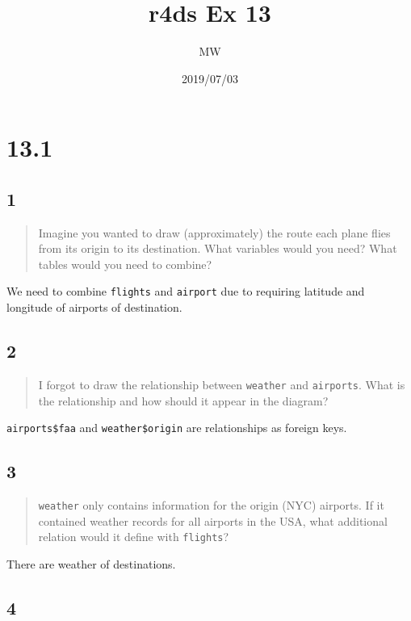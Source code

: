 \documentclass[]{ltjsarticle}
\title{r4ds Ex 13}
\author{MW}
\date{2019/07/03}
\begin{document}
\maketitle

\hypertarget{section}{%
\section{13.1}\label{section}}

\hypertarget{section-1}{%
\subsection{1}\label{section-1}}

\begin{quote}
Imagine you wanted to draw (approximately) the route each plane flies
from its origin to its destination. What variables would you need? What
tables would you need to combine?
\end{quote}

We need to combine \texttt{flights} and \texttt{airport} due to
requiring latitude and longitude of airports of destination.

\hypertarget{section-2}{%
\subsection{2}\label{section-2}}

\begin{quote}
I forgot to draw the relationship between \texttt{weather} and
\texttt{airports}. What is the relationship and how should it appear in
the diagram?
\end{quote}

\texttt{airports\$faa} and \texttt{weather\$origin} are relationships as
foreign keys.

\hypertarget{section-3}{%
\subsection{3}\label{section-3}}

\begin{quote}
\texttt{weather} only contains information for the origin (NYC)
airports. If it contained weather records for all airports in the USA,
what additional relation would it define with \texttt{flights}?
\end{quote}

There are weather of destinations.

\hypertarget{section-4}{%
\subsection{4}\label{section-4}}
\end{document}

